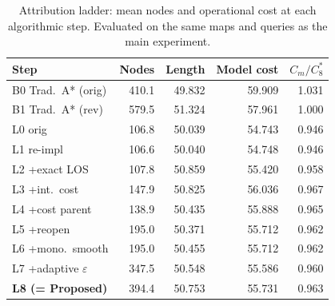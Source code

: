 \begin{table}[htbp]
\centering\small
\caption{Attribution ladder: mean nodes and operational cost at each algorithmic step. Evaluated on the same maps and queries as the main experiment.}\label{tab:bridge}
\begin{tabular}{lrrrr}
\toprule
Step & Nodes & Length & Model cost & $C_m/C^*_8$ \\
\midrule
B0 Trad.~A* (orig) & 410.1 & 49.832 & 59.909 & 1.031 \\
B1 Trad.~A* (rev) & 579.5 & 51.324 & 57.961 & 1.000 \\
\midrule
L0 orig & 106.8 & 50.039 & 54.743 & 0.946 \\
L1 re-impl & 106.6 & 50.040 & 54.748 & 0.946 \\
L2 +exact LOS & 107.8 & 50.859 & 55.420 & 0.958 \\
L3 +int.~cost & 147.9 & 50.825 & 56.036 & 0.967 \\
L4 +cost parent & 138.9 & 50.435 & 55.888 & 0.965 \\
L5 +reopen & 195.0 & 50.371 & 55.712 & 0.962 \\
L6 +mono.~smooth & 195.0 & 50.455 & 55.712 & 0.962 \\
L7 +adaptive $\varepsilon$ & 347.5 & 50.548 & 55.586 & 0.960 \\
\textbf{L8 (= Proposed)} & 394.4 & 50.753 & 55.731 & 0.963 \\
\bottomrule
\end{tabular}
\end{table}
